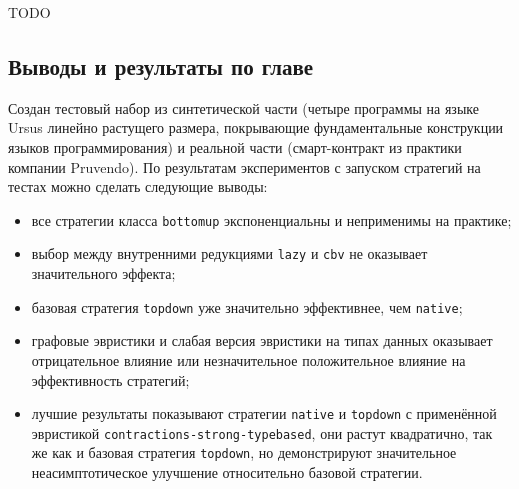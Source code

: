 \documentclass[../diploma.tex]{subfiles}
\begin{document}
TODO

\subsection{Выводы и результаты по главе}

Создан тестовый набор из синтетической части (четыре программы на языке Ursus линейно растущего размера, покрывающие фундаментальные конструкции языков программирования) и реальной части (смарт-контракт из практики компании Pruvendo). По результатам экспериментов с запуском стратегий на тестах можно сделать следующие выводы:

\begin{itemize}
    \item все стратегии класса \texttt{bottomup} экспоненциальны и неприменимы на практике; 
    \item выбор между внутренними редукциями \texttt{lazy} и \texttt{cbv} не оказывает значительного эффекта; 
    \item базовая стратегия \texttt{topdown} уже значительно эффективнее, чем \texttt{native}; 
    \item графовые эвристики и слабая версия эвристики на типах данных оказывает отрицательное влияние или незначительное положительное влияние на эффективность стратегий;
    \item лучшие результаты показывают стратегии \texttt{native} и \texttt{topdown} с применённой эвристикой \texttt{contractions-strong-typebased}, они растут квадратично, так же как и базовая стратегия \texttt{topdown}, но демонстрируют значительное неасимптотическое улучшение относительно базовой стратегии.
\end{itemize}
\end{document}
